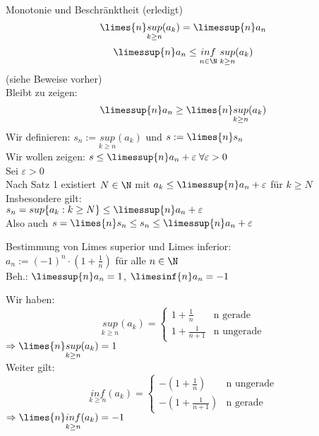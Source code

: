 \documentclass[12pt,a4paper,titlepage,draft]{article}
\begin{document}
	\begin{bew}
		Monotonie und Beschränktheit (erledigt)\\
		\[\limes{n} \underset{k \geq n}{sup} (a_k) = \limessup{n} a_n\]
		\[\limessup{n} a_n \leq \underset{n \in \N}{inf} \; \underset{k \geq n}{sup} (a_k)\]
		(siehe Beweise vorher)\\
		Bleibt zu zeigen:
		\[\limessup{n} a_n \geq \limes{n} \underset{k \geq n}{sup} (a_k)\]
		Wir definieren: \(s_n := \underset{k \geq n}{sup} (a_k)\) und \(s := \limes{n} s_n\)\\
		Wir wollen zeigen: \(s \leq \limessup{n} a_n + \varepsilon \; \forall \varepsilon > 0\)\\
		Sei \(\varepsilon > 0\)\\
		Nach Satz 1 existiert \(N \in \N\) mit \(a_k \leq \limessup{n} a_n + \varepsilon\) für \(k \geq N\)\\
		Insbesondere gilt:\\
		\(s_n = sup\{a_k: k \geq N\} \leq \limessup{n} a_n + \varepsilon\)\\
		Also auch \(s = \limes{n} s_n \leq s_n \leq \limessup{n} a_n + \varepsilon\)\\
	\end{bew}	
	\begin{bsp}
		Bestimmung von Limes superior und Limes inferior:\\
		\(a_n := (-1)^n \cdot (1 + \frac{1}{n})\) für alle \(n \in \N\)\\
		Beh.: \(\limessup{n} a_n = 1\), \(\limesinf{n} a_n = -1\)\\
		\begin{bew}
			Wir haben:
			\[\underset{k \geq n}{sup} (a_k) =\begin{cases}
			1 + \frac{1}{n} & \text{n gerade}\\
			1 + \frac{1}{n + 1} & \text{n ungerade}
			\end{cases} \]
			\(\Rightarrow \limes{n} \underset{k \geq n}{sup} (a_k) = 1\)\\
			Weiter gilt:
			\[\underset{k \geq n}{inf} (a_k) =\begin{cases}
			-(1 + \frac{1}{n} )& \text{n ungerade}\\
			-(1 + \frac{1}{n + 1}) & \text{n gerade}
			\end{cases} \]
			\(\Rightarrow \limes{n} \underset{k \geq n}{inf} (a_k) = -1\)\\
		\end{bew}
	\end{bsp}
\end{document}

